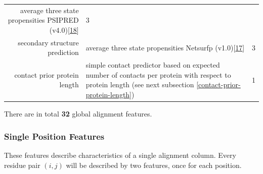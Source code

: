 \documentclass[12pt,a4paper,twoside]{book}
\theoremstyle{definition}
\theoremstyle{definition}
\theoremstyle{remark}
\begin{document}
\begin{longtable}[]{@{}rlc@{}}
\begin{minipage}[t]{0.50\columnwidth}
average three state propensities PSIPRED
(v4.0){[}\protect\hyperlink{ref-Jones1999}{18}{]}\strut
\end{minipage} & \begin{minipage}[t]{0.18\columnwidth}\centering\strut
3\strut
\end{minipage}\tabularnewline
\begin{minipage}[t]{0.23\columnwidth}\raggedleft\strut
secondary structure prediction\strut
\end{minipage} & \begin{minipage}[t]{0.50\columnwidth}\raggedright\strut
average three state propensities Netsurfp
(v1.0){[}\protect\hyperlink{ref-Petersen2009a}{17}{]}\strut
\end{minipage} & \begin{minipage}[t]{0.18\columnwidth}\centering\strut
3\strut
\end{minipage}\tabularnewline
\begin{minipage}[t]{0.23\columnwidth}\raggedleft\strut
contact prior protein length\strut
\end{minipage} & \begin{minipage}[t]{0.50\columnwidth}\raggedright\strut
simple contact predictor based on expected number of contacts per
protein with respect to protein length (see next subsection
\ref{contact-prior-protein-length})\strut
\end{minipage} & \begin{minipage}[t]{0.18\columnwidth}\centering\strut
1\strut
\end{minipage}\tabularnewline
\bottomrule
\end{longtable}

There are in total \textbf{32} global alignment features.

\subsubsection{Single Position Features}\label{seq-features-single}

These features describe characteristics of a single alignment column.
Every residue pair \((i,j)\) will be described by two features, once for
each position.
\end{document}
